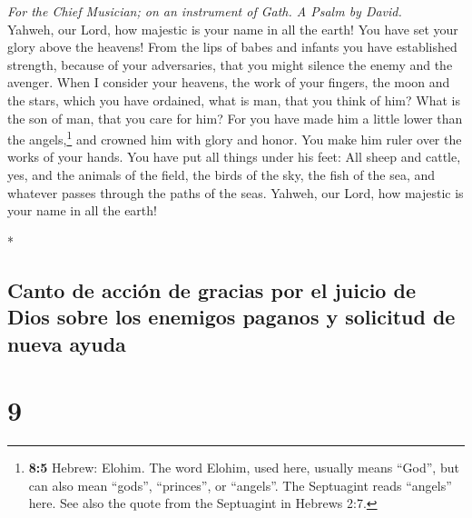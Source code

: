 \begin{paracol}{2}
\begin{otherlanguage}{english}
\emph{For the Chief Musician; on an instrument of Gath. A Psalm by
David.}\\
 Yahweh, our Lord, how majestic is your name in all the
earth! You have set your glory above the heavens!  From
the lips of babes and infants you have established strength, because of
your adversaries, that you might silence the enemy and the avenger.
 When I consider your heavens, the work of your fingers,
the moon and the stars, which you have ordained,  what is
man, that you think of him? What is the son of man, that you care for
him?  For you have made him a little lower than the
angels,\footnote{\textbf{8:5} Hebrew: Elohim. The word Elohim, used
  here, usually means ``God'', but can also mean ``gods'', ``princes'',
  or ``angels''. The Septuagint reads ``angels'' here. See also the
  quote from the Septuagint in Hebrews 2:7.} and crowned him with glory
and honor.  You make him ruler over the works of your
hands. You have put all things under his feet:  All sheep
and cattle, yes, and the animals of the field,  the birds
of the sky, the fish of the sea, and whatever passes through the paths
of the seas.  Yahweh, our Lord, how majestic is your name
in all the earth!

\end{otherlanguage}

\switchcolumn[0]*

\hypertarget{canto-de-acciuxf3n-de-gracias-por-el-juicio-de-dios-sobre-los-enemigos-paganos-y-solicitud-de-nueva-ayuda}{%
\subsection{Canto de acción de gracias por el juicio de Dios sobre los
enemigos paganos y solicitud de nueva
ayuda}\label{canto-de-acciuxf3n-de-gracias-por-el-juicio-de-dios-sobre-los-enemigos-paganos-y-solicitud-de-nueva-ayuda}}

\hypertarget{section-16}{%
\section{9}\label{section-16}}


\end{paracol}
